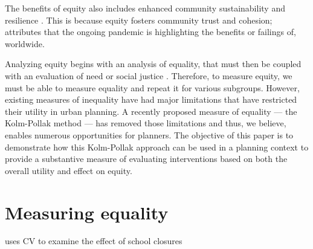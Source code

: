 \documentclass[final,3p,times,onecolumn,sort&compress]{elsarticle}
\begin{document}
The benefits of equity also includes enhanced community sustainability and resilience \cite{Dempsey2011-og, cutter, Logan2020-vj}.
This is because equity fosters community trust and cohesion; attributes that the ongoing pandemic is highlighting the benefits or failings of, worldwide.

Analyzing equity begins with an analysis of equality, that must then be coupled with an evaluation of need or social justice \cite{talen-anselin1998}.
Therefore, to measure equity, we must be able to measure equality and repeat it for various subgroups.
However, existing measures of inequality have had major limitations that have restricted their utility in urban planning. 
A recently proposed measure of equality --- the Kolm-Pollak method --- has removed those limitations \citep{Sheriff2020-ge} and thus, we believe, enables numerous opportunities for planners.
The objective of this paper is to demonstrate how this Kolm-Pollak approach can be used in a planning context to provide a substantive measure of evaluating interventions based on both the overall utility and effect on equity.

\section{Measuring equality}
\cite{Pacione1989-ui} uses CV to examine the effect of school closures
\end{document}
